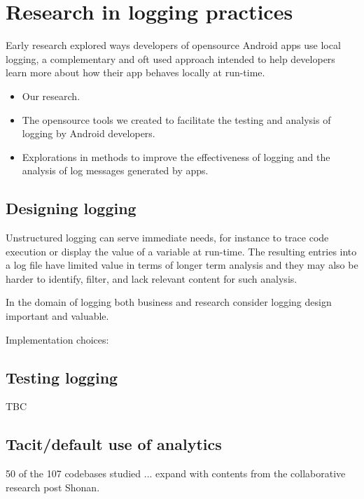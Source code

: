 
\section{Research in logging practices}
Early research explored ways developers of opensource Android apps use local logging, a complementary and oft used approach intended to help developers learn more about how their app behaves locally at run-time. 

\begin{itemize}
    \item Our research.
    \item The opensource tools we created to facilitate the testing and analysis of logging by Android developers.
    \item Explorations in methods to improve the effectiveness of logging and the analysis of log messages generated by apps.
\end{itemize}

\subsection{Designing logging}
Unstructured logging can serve immediate needs, for instance to trace code execution or display the value of a variable at run-time. The resulting entries into a log file have limited value in terms of longer term analysis and they may also be harder to identify, filter, and lack relevant content for such analysis.

In the domain of logging both business and research consider logging design important and valuable. 

Implementation choices: 

\subsection{Testing logging}
TBC

\subsection{Tacit/default use of analytics}
50 of the 107 codebases studied ... expand with contents from the collaborative research post Shonan.